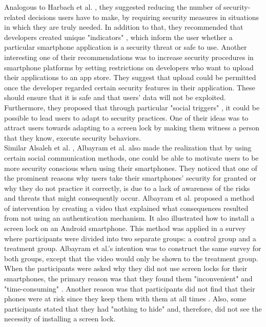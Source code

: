 Analogous to Harbach et al. \cite{harbach}, they suggested reducing the number of security-related decisions users have to make, by requiring security measures in situations in which they are truly needed. In addition to that, they recommended that developers created unique "indicators" \cite{Alsaleh}, which inform the user whether a particular smartphone application is a security threat or safe to use. Another interesting one of their recommendations was to increase security procedures in smartphone platforms by setting restrictions on developers who want to upload their applications to an app store. They suggest that upload could be permitted once the developer regarded certain security features in their application.  These should ensure that it is safe and that users' data will not be exploited. Furthermore, they proposed that through particular "social triggers" \cite{Alsaleh}, it could be possible to lead users to adapt to security practices. One of their ideas was to attract users towards adapting to a screen lock by making them witness a person that they know, execute security behaviors. \\

Similar Alsaleh et al. \cite{Alsaleh}, Albayram et al. \cite{Albayram:2017:BUL:3235924.3235929} also made the realization that by using certain social communication methods, one could be able to motivate users to be more security conscious when using their smartphones. They noticed that one of the prominent reasons why users take their smartphones' security for granted or why they do not practice it correctly, is due to a lack of awareness of the risks and threats that might consequently occur. Albayram et al. \cite{Albayram:2017:BUL:3235924.3235929} proposed a method of intervention by creating a video that explained what consequences resulted from not using an authentication mechanism. It also illustrated how to install a screen lock on an Android smartphone. This method was applied in a survey where participants were divided into two separate groups: a control group and a treatment group. Albayram et al.'s \cite{Albayram:2017:BUL:3235924.3235929} intention was to construct the same survey for both groups, except that the video would only be shown to the treatment group. When the participants were asked why they did not use screen locks for their smartphones, the primary reason was that they found them "inconvenient" and "time-consuming" \cite{Albayram:2017:BUL:3235924.3235929}. Another reason was that participants did not find that their phones were at risk since they keep them with them at all times \cite{Albayram:2017:BUL:3235924.3235929}. Also, some participants stated that they had "nothing to hide" and, therefore, did not see the necessity of installing a screen lock.\\

